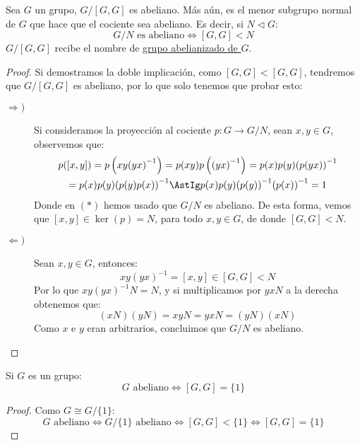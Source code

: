 \begin{prop}\label{prop:abelianizado}
    Sea $G$ un grupo, $G/[G,G]$ es abeliano. Más aún, es el menor subgrupo normal de $G$ que hace que el cociente sea abeliano. Es decir, si $N\lhd G$:
    \begin{equation*}
        G/N \text{\ es abeliano} \Longleftrightarrow [G,G] < N
    \end{equation*}
    $G/[G,G]$ recibe el nombre de \underline{grupo abelianizado de $G$}.
    \begin{proof}
        Si demostramos la doble implicación, como $[G,G] < [G,G]$, tendremos que $G/[G,G]$ es abeliano, por lo que solo tenemos que probar esto:
        \begin{description}
            \item [$\Longrightarrow)$] Si consideramos la proyección al cociente $p:G\to G/N$, sean $x,y\in G$, observemos que:
                \begin{multline*}
                    p([x,y]) = p\left(xy{(yx)}^{-1}\right) = p(xy)p\left({(yx)}^{-1}\right) = p(x)p(y){(p(yx))}^{-1} \\ = p(x) p(y) {(p(y)p(x))}^{-1} \AstIg p(x)p(y) {(p(y))}^{-1}{(p(x))}^{-1} = 1
                \end{multline*}
                Donde en $(\ast)$ hemos usado que $G/N$ es abeliano. De esta forma, vemos que $[x,y]\in \ker(p) = N$, para todo $x,y\in G$, de donde $[G,G] < N$.
            \item [$\Longleftarrow)$] Sean $x,y\in G$, entonces:
                \begin{equation*}
                    xy{(yx)}^{-1} = [x,y] \in [G,G] < N
                \end{equation*}
                Por lo que $xy{(yx)}^{-1}N = N$, y si multiplicamos por $yxN$ a la derecha obtenemos que:
                \begin{equation*}
                    (xN)(yN) = xyN = yxN = (yN)(xN)
                \end{equation*}
                Como $x$ e $y$ eran arbitrarios, concluimos que $G/N$ es abeliano.
        \end{description}
    \end{proof}
\end{prop}

\begin{coro}\label{coro:abeliano_conmutador}
    Si $G$ es un grupo:
    \begin{equation*}
        G \text{\ abeliano} \Longleftrightarrow [G,G] = \{1\}
    \end{equation*}
    \begin{proof}
        Como $G\cong G/\{1\}$:
        \begin{equation*}
            G \text{\ abeliano} \Longleftrightarrow G/\{1\} \text{\ abeliano} \Longleftrightarrow [G,G] < \{1\} \Longleftrightarrow [G,G] = \{1\}
        \end{equation*}
    \end{proof}
\end{coro}

